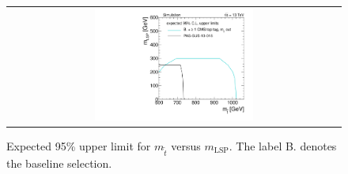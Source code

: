 \begin{figure}[!t]
  \centering
  \begin{tabular}{c}
                \includegraphics[width=0.49\textwidth]{figures/2Dlimitplot.pdf} 
  \end{tabular}
  \caption{Expected 95\% upper limit for $m_{\tilde{t}}$ versus $m_\mathrm{LSP}$. The label B. denotes the baseline selection.}
  \label{fig:stop_2Dlimit}
\end{figure} 

